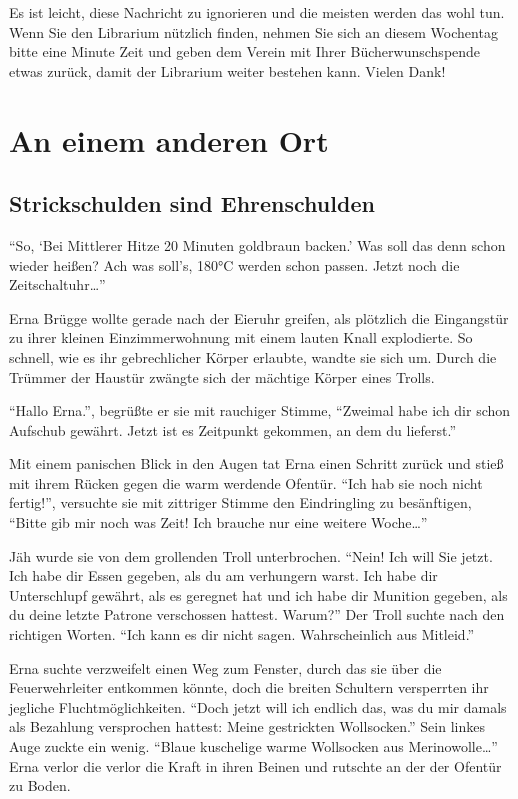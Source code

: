 Es ist leicht, diese Nachricht zu ignorieren und die meisten werden das wohl tun. Wenn Sie den Librarium nützlich finden, nehmen Sie sich an diesem Wochentag bitte eine Minute Zeit und geben dem Verein mit Ihrer Bücherwunschspende etwas zurück, damit der Librarium weiter bestehen kann. Vielen Dank!

\section{An einem anderen Ort}

\subsection{Strickschulden sind Ehrenschulden}
\enquote{So, \enquote{Bei Mittlerer Hitze 20 Minuten goldbraun backen.} Was soll das denn schon wieder heißen? Ach was soll's, 180°C werden schon passen.
Jetzt noch die Zeitschaltuhr\dots}

Erna Brügge wollte gerade nach der Eieruhr greifen, als plötzlich die Eingangstür zu ihrer kleinen Einzimmerwohnung mit einem lauten Knall explodierte. So schnell, wie es ihr gebrechlicher Körper erlaubte, wandte sie sich um. Durch die Trümmer der Haustür zwängte sich der mächtige Körper eines Trolls.

\enquote{Hallo Erna.}, begrüßte er sie mit rauchiger Stimme,
\enquote{Zweimal habe ich dir schon Aufschub gewährt. Jetzt ist es Zeitpunkt gekommen, an dem du lieferst.}

Mit einem panischen Blick in den Augen tat Erna einen Schritt zurück und stieß mit ihrem Rücken gegen die warm werdende Ofentür. \enquote{Ich hab sie noch nicht fertig!}, versuchte sie mit zittriger Stimme den Eindringling zu besänftigen, \enquote{Bitte gib mir noch was Zeit! Ich brauche nur eine weitere Woche\dots}

Jäh wurde sie von dem grollenden Troll unterbrochen.
\enquote{Nein! Ich will Sie jetzt. Ich habe dir Essen gegeben, als du am verhungern warst. Ich habe dir Unterschlupf gewährt, als es geregnet hat und ich habe dir Munition gegeben, als du deine letzte Patrone verschossen hattest. Warum?} Der Troll suchte nach den richtigen Worten. \enquote{Ich kann es dir nicht sagen. Wahrscheinlich aus Mitleid.}

Erna suchte verzweifelt einen Weg zum Fenster, durch das sie über die Feuerwehrleiter entkommen könnte, doch die breiten Schultern versperrten ihr jegliche Fluchtmöglichkeiten.
\enquote{Doch jetzt will ich endlich das, was du mir damals als Bezahlung versprochen hattest: Meine gestrickten Wollsocken.} Sein linkes Auge zuckte ein wenig. \enquote{Blaue kuschelige warme Wollsocken aus Merinowolle\dots}
Erna verlor die verlor die Kraft in ihren Beinen und rutschte an der der Ofentür zu Boden.

